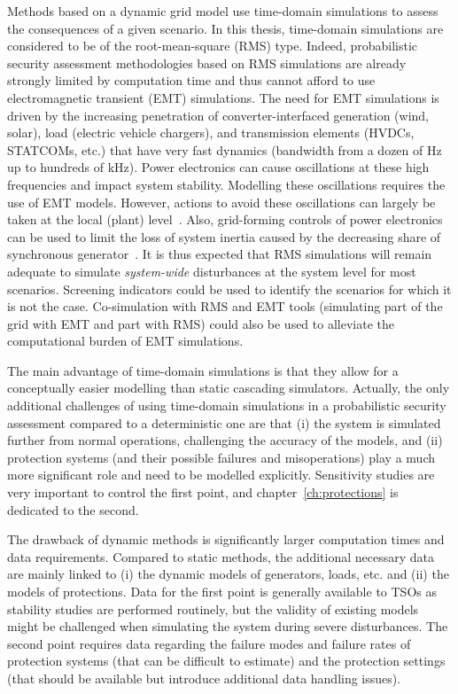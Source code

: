Methods based on a dynamic grid model use time-domain simulations to assess the consequences of a given scenario. In this thesis, time-domain simulations are considered to be of the root-mean-square (RMS) type. Indeed, probabilistic security assessment methodologies based on RMS simulations are already strongly limited by computation time and thus cannot afford to use electromagnetic transient (EMT) simulations. The need for EMT simulations is driven by the increasing penetration of converter-interfaced generation (wind, solar), load (electric vehicle chargers), and transmission elements (HVDCs, STATCOMs, etc.) that have very fast dynamics (bandwidth from a dozen of Hz up to hundreds of kHz). Power electronics can cause oscillations at these high frequencies and impact system stability. Modelling these oscillations requires the use of EMT models. However, actions to avoid these oscillations can largely be taken at the local (plant) level~\cite{AvoidEMT}. Also, grid-forming controls of power electronics can be used to limit the loss of system inertia caused by the decreasing share of synchronous generator~\cite{GridFormingAreTheyTheKey}. It is thus expected that RMS simulations will remain adequate to simulate \emph{system-wide} disturbances at the system level for most scenarios. Screening indicators could be used to identify the scenarios for which it is not the case. Co-simulation with RMS and EMT tools (simulating part of the grid with EMT and part with RMS) could also be used to alleviate the computational burden of EMT simulations.

The main advantage of time-domain simulations is that they allow for a conceptually easier modelling than static cascading simulators. Actually, the only additional challenges of using time-domain simulations in a probabilistic security assessment compared to a deterministic one are that (i) the system is simulated further from normal operations, challenging the accuracy of the models, and (ii) protection systems (and their possible failures and misoperations) play a much more significant role and need to be modelled explicitly. Sensitivity studies are very important to control the first point, and chapter~\ref{ch:protections} is dedicated to the second.

The drawback of dynamic methods is significantly larger computation times and data requirements. Compared to static methods, the additional necessary data are mainly linked to (i) the dynamic models of generators, loads, etc. and (ii) the models of protections. Data for the first point is generally available to TSOs as stability studies are performed routinely, but the validity of existing models might be challenged when simulating the system during severe disturbances.  The second point requires data regarding the failure modes and failure rates of protection systems (that can be difficult to estimate) and the protection settings (that should be available but introduce additional data handling issues).

